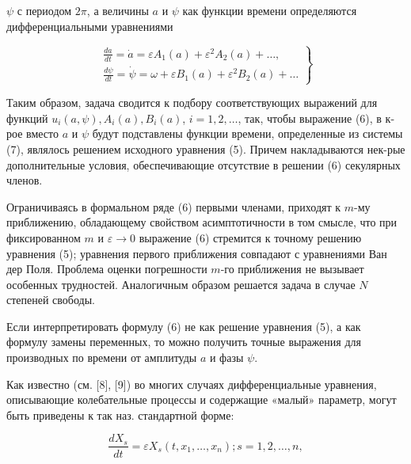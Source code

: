 \documentclass[10pt]{article}
\begin{document}
$\psi$ с периодом $2 \pi$, а величины $a$ и $\psi$ как функции времени определяются дифференциальными уравнениями



\[

\left.\begin{array}{l}

\frac{d a}{d t}=\dot{a}=\varepsilon A_{1}(a)+\varepsilon^{2} A_{2}(a)+\ldots, \\

\frac{d \psi}{d t}=\dot{\psi}=\omega+\varepsilon B_{1}(a)+\varepsilon^{2} B_{2}(a)+\ldots

\end{array}\right\}

\]



Таким образом, задача сводится к подбору соответствующих выражений для функций $u_{i}(a, \psi), A_{i}(a), B_{i}(a)$, $i=1,2, \ldots$, так, чтобы выражение (6), в к-рое вместо $a$ и $\psi$ будут подставлены функции времени, определенные из системы (7), являлось решением исходного уравнения (5). Причем накладываются нек-рые дополнительные условия, обеспечивающие отсутствие в решении (6) секулярных членов.



Ограничиваясь в формальном ряде (6) первыми членами, приходят к $m$-му приближению, обладающему свойством асимптотичности в том смысле, что при фиксированном $m$ и $\varepsilon \rightarrow 0$ выражение (6) стремится к точному решению уравнения (5); уравнения первого приближения совпадают с уравнениями Ван дер Поля. Проблема оценки погрешности $m$-го приближения не вызывает особенных трудностей. Аналогичным образом решается задача в случае $N$ степеней свободы.



Если интерпретировать формулу (6) не как решение уравнения (5), а как формулу замены переменных, то можно получить точные выражения для производных по времени от амплитуды $a$ и фазы $\psi$.



Как известно (см. [8], [9]) во многих случаях дифференциальные уравнения, описывающие колебательные процессы и содержащие «малый» параметр, могут быть приведены к так наз. стандартной форме:



\[

\frac{d X_{s}}{d t}=\varepsilon X_{s}\left(t, x_{1}, \ldots, x_{n}\right) ; s=1,2, \ldots, n,

\]
\end{document}
